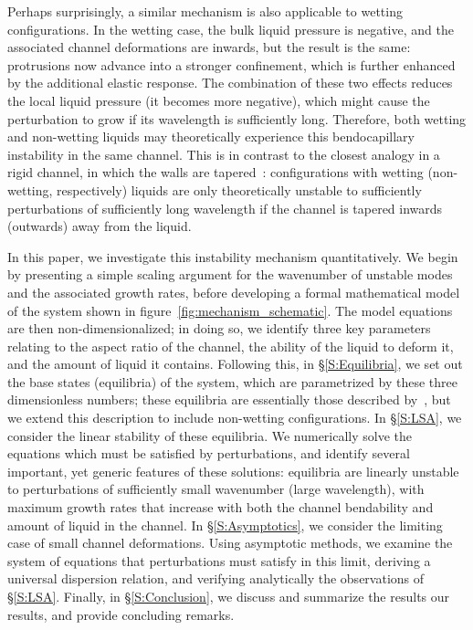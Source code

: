 \documentclass{jfm}
\begin{document}
Perhaps surprisingly, a similar mechanism is also applicable to wetting configurations. In the wetting case, the bulk liquid pressure is negative, and the associated channel deformations are inwards, but the result is the same: protrusions now advance into a stronger confinement, which is further enhanced by the additional elastic response. The combination of these two effects reduces the local liquid pressure (it becomes more negative), which might cause the perturbation to grow if its wavelength is sufficiently long. Therefore, both wetting and non-wetting liquids may theoretically experience this bendocapillary instability in the same channel. This is in contrast to the closest analogy in a rigid channel, in which the walls are tapered~\cite{AlHousseiny2012NaturePhysics}: configurations with wetting (non-wetting, respectively) liquids are only theoretically unstable to sufficiently perturbations of sufficiently long wavelength if the channel is tapered inwards (outwards) away from the liquid.

In this paper, we investigate this instability mechanism quantitatively. We begin by presenting a simple scaling argument for the wavenumber of unstable modes and the associated growth rates, before developing a formal mathematical model of the system shown in figure~\ref{fig:mechanism_schematic}. The model equations are then non-dimensionalized; in doing so, we identify three key parameters relating to the aspect ratio of the channel, the ability of the liquid to deform it, and the amount of liquid it contains. Following this, in \S\ref{S:Equilibria}, we set out the base states (equilibria) of the system, which are parametrized by these three dimensionless numbers; these equilibria are essentially those described by~\citet{Taroni2012JFM}, but we extend this description to include non-wetting configurations. In \S\ref{S:LSA}, we consider the linear stability of these equilibria. We numerically solve the equations which must be satisfied by perturbations, and identify several important, yet generic features of these solutions: equilibria are linearly unstable to perturbations of sufficiently small wavenumber (large wavelength), with maximum growth rates that increase with both the channel bendability and amount of liquid in the channel. In \S\ref{S:Asymptotics}, we consider the limiting case of small channel deformations. Using asymptotic methods, we examine the system of equations that perturbations must satisfy in this limit, deriving a universal dispersion relation, and verifying analytically the observations of \S\ref{S:LSA}. Finally, in \S\ref{S:Conclusion}, we discuss and summarize the results our results, and provide concluding remarks.
\end{document}
